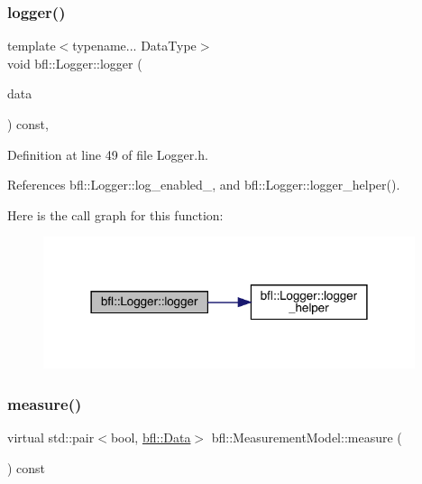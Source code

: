 \subsubsection{\texorpdfstring{logger()}{logger()}\hspace{0.1cm}{\footnotesize\ttfamily [4/4]}}
{\footnotesize\ttfamily template$<$typename... Data\+Type$>$ \\
void bfl\+::\+Logger\+::logger (\begin{DoxyParamCaption}\item[{Data\+Type...}]{data }\end{DoxyParamCaption}) const\hspace{0.3cm}{\ttfamily [inline]}, {\ttfamily [inherited]}}



Definition at line 49 of file Logger.\+h.



References bfl\+::\+Logger\+::log\+\_\+enabled\+\_\+, and bfl\+::\+Logger\+::logger\+\_\+helper().

Here is the call graph for this function\+:
\nopagebreak
\begin{figure}[H]
\begin{center}
\leavevmode
\includegraphics[width=309pt]{classbfl_1_1Logger_a0f0cf7ce956546d94dfb1feb7cebf171_cgraph}
\end{center}
\end{figure}
\mbox{\label{classbfl_1_1MeasurementModel_ad372b720cef4e6bc0ac2489f4098bfc9}} 
\subsubsection{\texorpdfstring{measure()}{measure()}}
{\footnotesize\ttfamily virtual std\+::pair$<$bool, \mbox{\hyperlink{namespacebfl_af6b103c6821db1b54452f776fdd9dd02}{bfl\+::\+Data}}$>$ bfl\+::\+Measurement\+Model\+::measure (\begin{DoxyParamCaption}{ }\end{DoxyParamCaption}) const\hspace{0.3cm}{\ttfamily [pure virtual]}}



